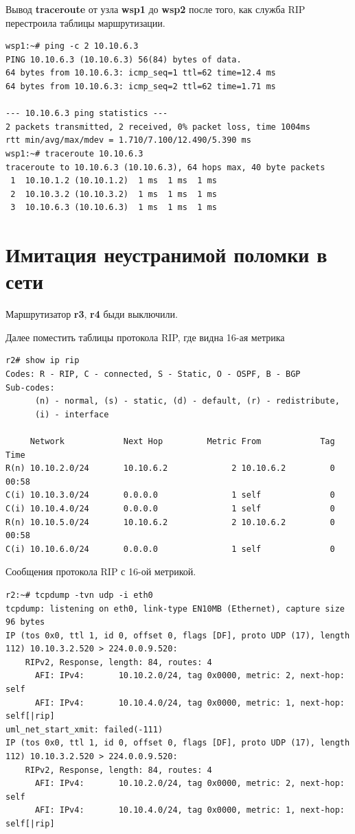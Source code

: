 \documentclass[a4paper,12pt]{article}
\begin{document}
Вывод \textbf{traceroute} от узла \textbf{wsp1} до \textbf{wsp2} после того, как служба RIP перестроила таблицы маршрутизации.

\begin{Verbatim}
wsp1:~# ping -c 2 10.10.6.3
PING 10.10.6.3 (10.10.6.3) 56(84) bytes of data.
64 bytes from 10.10.6.3: icmp_seq=1 ttl=62 time=12.4 ms
64 bytes from 10.10.6.3: icmp_seq=2 ttl=62 time=1.71 ms

--- 10.10.6.3 ping statistics ---
2 packets transmitted, 2 received, 0% packet loss, time 1004ms
rtt min/avg/max/mdev = 1.710/7.100/12.490/5.390 ms
wsp1:~# traceroute 10.10.6.3
traceroute to 10.10.6.3 (10.10.6.3), 64 hops max, 40 byte packets
 1  10.10.1.2 (10.10.1.2)  1 ms  1 ms  1 ms
 2  10.10.3.2 (10.10.3.2)  1 ms  1 ms  1 ms
 3  10.10.6.3 (10.10.6.3)  1 ms  1 ms  1 ms
\end{Verbatim}

\section{Имитация неустранимой поломки в сети}

Маршрутизатор \textbf{r3}, \textbf{r4} быди выключили.

Далее поместить таблицы протокола RIP, где видна 16-ая метрика

\begin{Verbatim}
r2# show ip rip
Codes: R - RIP, C - connected, S - Static, O - OSPF, B - BGP
Sub-codes:
      (n) - normal, (s) - static, (d) - default, (r) - redistribute,
      (i) - interface

     Network            Next Hop         Metric From            Tag Time
R(n) 10.10.2.0/24       10.10.6.2             2 10.10.6.2         0 00:58
C(i) 10.10.3.0/24       0.0.0.0               1 self              0
C(i) 10.10.4.0/24       0.0.0.0               1 self              0
R(n) 10.10.5.0/24       10.10.6.2             2 10.10.6.2         0 00:58
C(i) 10.10.6.0/24       0.0.0.0               1 self              0
\end{Verbatim}

Сообщения протокола RIP с 16-ой метрикой.

\begin{Verbatim}
r2:~# tcpdump -tvn udp -i eth0
tcpdump: listening on eth0, link-type EN10MB (Ethernet), capture size 96 bytes
IP (tos 0x0, ttl 1, id 0, offset 0, flags [DF], proto UDP (17), length 112) 10.10.3.2.520 > 224.0.0.9.520: 
	RIPv2, Response, length: 84, routes: 4
	  AFI: IPv4:       10.10.2.0/24, tag 0x0000, metric: 2, next-hop: self
	  AFI: IPv4:       10.10.4.0/24, tag 0x0000, metric: 1, next-hop: self[|rip]
uml_net_start_xmit: failed(-111)
IP (tos 0x0, ttl 1, id 0, offset 0, flags [DF], proto UDP (17), length 112) 10.10.3.2.520 > 224.0.0.9.520: 
	RIPv2, Response, length: 84, routes: 4
	  AFI: IPv4:       10.10.2.0/24, tag 0x0000, metric: 2, next-hop: self
	  AFI: IPv4:       10.10.4.0/24, tag 0x0000, metric: 1, next-hop: self[|rip]
\end{Verbatim}
\end{document}
